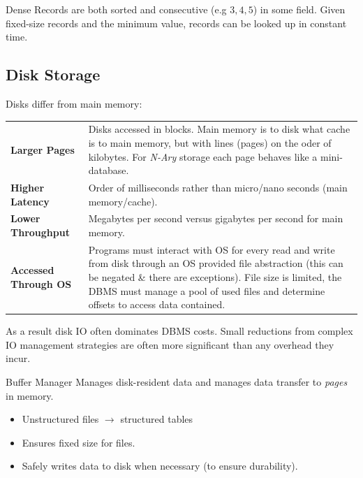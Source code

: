 \begin{definitionbox}{Dense}
    Records are both sorted and consecutive (e.g $3,4,5$) in some field. Given fixed-size records and the minimum value, records can be looked up in constant time. 
\end{definitionbox}

\subsection{Disk Storage}
Disks differ from main memory:
\begin{center}
    \begin{tabular}{l p{}}
        \textbf{Larger Pages}        & Disks accessed in blocks. Main memory is to disk what cache is to main memory, but with lines (pages) on the oder of kilobytes. For \textit{N-Ary} storage each page behaves like a mini-database. \\
        \textbf{Higher Latency}      & Order of milliseconds rather than micro/nano seconds (main memory/cache). \\
        \textbf{Lower Throughput}    & Megabytes per second versus gigabytes per second for main memory. \\
        \textbf{Accessed Through OS} & Programs must interact with OS for every read and write from disk through an OS provided file abstraction (this can be negated \& there are exceptions). File size is limited, the DBMS must manage a pool of used files and determine offsets to access data contained. \\
    \end{tabular}
\end{center}
As a result disk IO often dominates DBMS costs. Small reductions from complex IO management strategies are often more significant than any overhead they incur. 


\begin{definitionbox}{Buffer Manager}
    Manages disk-resident data and manages data transfer to \textit{pages} in memory.
    \begin{itemize}
        \item Unstructured files $\to$ structured tables
        \item Ensures fixed size for files.
        \item Safely writes data to disk when necessary (to ensure durability).
    \end{itemize}
\end{definitionbox}


